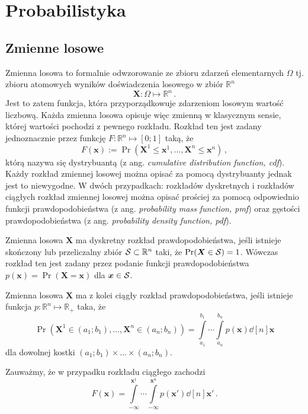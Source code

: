 \documentclass{myclass}
\numberwithin{equation}{subsection}
\begin{document}
\section{Probabilistyka}


\subsection{Zmienne losowe}

Zmienna losowa to formalnie odwzorowanie ze zbioru zdarzeń elementarnych \(\Omega\) tj. zbioru
atomowych wyników doświadczenia losowego w zbiór \(\mathbb{R}^n\)
\[
\bm{X} : \Omega \mapsto \mathbb{R}^n\,.
\]
Jest to zatem funkcja, która przyporządkowuje zdarzeniom losowym wartość liczbową. Każda zmienna
losowa opisuje więc zmienną w klasycznym sensie, której wartości pochodzi z pewnego rozkładu.
Rozkład ten jest zadany jednoznacznie przez funkcję \(F: \mathbb{R}^n \mapsto [0;1]\) taką, że
\[
F(\bm{x}) := \Pr(\bm{X}^1 \leq \bm{x}^1, \ldots, \bm{X}^n \leq \bm{x}^n)\,,
\]
którą nazywa się dystrybuantą (z ang. \textit{cumulative distribution function, cdf}). Każdy rozkład
zmiennej losowej można opisać za pomocą dystrybuanty jednak jest to niewygodne. W dwóch przypadkach:
rozkładów dyskretnych i rozkładów ciągłych rozkład zmiennej losowej można opisać prościej za pomocą
odpowiednio funkcji prawdopodobieństwa (z ang. \textit{probability mass function, pmf}) oraz
gęstości prawdopodobieństwa (z ang. \textit{probability density function, pdf}).

\begin{definition}
Zmienna losowa \(\bm{X}\) ma dyskretny rozkład prawdopodobieństwa, jeśli istnieje skończony lub
przeliczalny zbiór \(\mathcal{S} \subset \mathbb{R}^n\) taki, że \(\Pr(\bm{X} \in \mathcal{S}) = 1\). Wówczas
rozkład ten jest zadany przez podanie funkcji prawdopodobieństwa \(p(\bm{x}) = \Pr(\bm{X} =
\bm{x})\) dla \(\bm{x} \in \mathcal{S}\).
\end{definition}

\begin{definition}
Zmienna losowa \(\bm{X}\) ma z kolei ciągły rozkład prawdopodobieństwa, jeśli istnieje funkcja \(p:
\mathbb{R}^n \mapsto \mathbb{R}_+\) taka, że
\[
\Pr(\bm{X}^1 \in (a_1;b_1), \ldots, \bm{X}^n \in (a_n;b_n)) = \int\limits_{a_1}^{b_1}\cdots\int\limits_{a_n}^{b_n} p(\bm{x}) \dd[n]{\bm{x}}
\]
dla dowolnej kostki \((a_1;b_1)\times\ldots\times(a_n;b_n)\).
\end{definition}

Zauważmy, że w przypadku rozkładu ciągłego zachodzi
\[
F(\bm{x}) = \int\limits_{-\infty}^{\bm{x}^1}\cdots\int\limits_{-\infty}^{\bm{x}^n} p(\bm{x}') \dd[n]{\bm{x}'}\,.
\]
\end{document}
